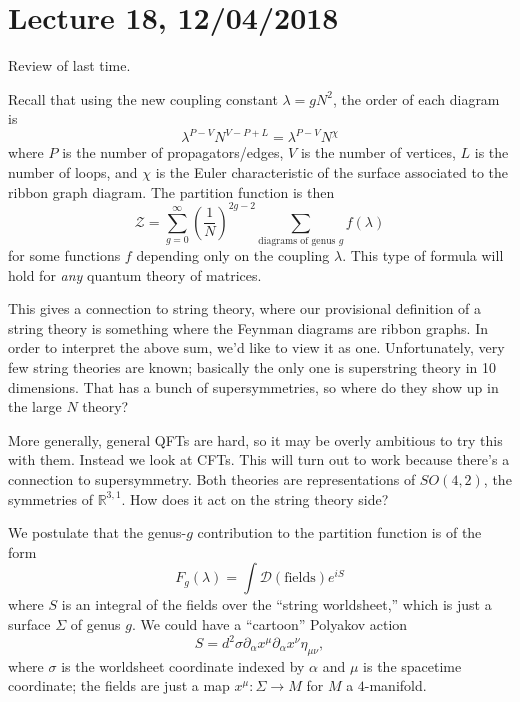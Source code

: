 \section*{Lecture 18, 12/04/2018}
Review of last time.

Recall that using the new coupling constant $\lambda = gN^2$, the order of each diagram is
\[
\lambda^{P-V} N^{V-P+L} = \lambda^{P-V}N^\chi
\]
where $P$ is the number of propagators/edges, $V$ is the number of vertices, $L$ is the number of loops, and $\chi$ is the Euler characteristic of the surface associated to the ribbon graph diagram.
The partition function is then
\[
\mathcal Z = \sum_{g =0}^\infty \left( \frac{1}{N} \right)^{2g-2} \sum_{\text{diagrams of genus } g} f(\lambda)
\]
for some functions $f$ depending only on the coupling $\lambda$.
This type of formula will hold for \emph{any} quantum theory of matrices.

This gives a connection to string theory, where our provisional definition of a string theory is something where the Feynman diagrams are ribbon graphs.
In order to interpret the above sum, we'd like to view it as one.
Unfortunately, very few string theories are known; basically the only one is superstring theory in 10 dimensions.
That has a bunch of supersymmetries, so where do they show up in the large $N$ theory?

More generally, general QFTs are hard, so it may be overly ambitious to try this with them.
Instead we look at CFTs.
This will turn out to work because there's a connection to supersymmetry.
Both theories are representations of $SO(4,2)$, the symmetries of $\mathbb{R}^{3,1}$.
How does it act on the string theory side?

We postulate that the genus-$g$ contribution to the partition function is of the form
\[
F_g(\lambda) = \int \mathcal D (\text{fields}) e^{i S}
\]
where $S$ is an integral of the fields over the ``string worldsheet,'' which is just a surface $\Sigma$ of genus $g$.
We could have a ``cartoon'' Polyakov action
\[
 S = d^2 \sigma \partial_\alpha x^\mu \partial_\alpha x^\nu \eta_{\mu \nu},
\]
where $\sigma$ is the worldsheet coordinate indexed by $\alpha$ and $\mu$ is the spacetime coordinate; the fields are just a map $x^\mu : \Sigma \to M$ for $M$ a $4$-manifold.

